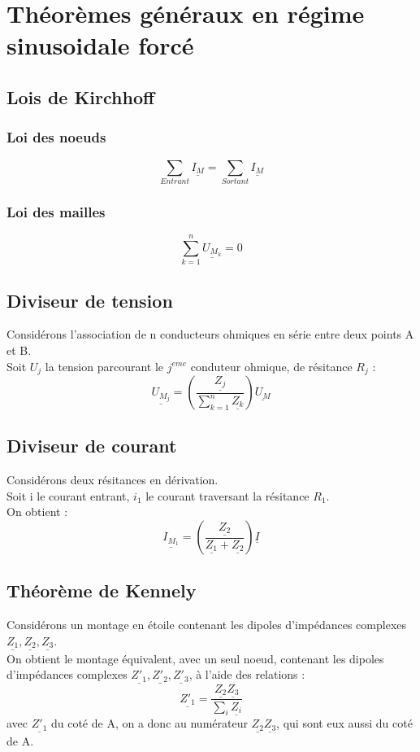 \section{Théorèmes généraux en régime sinusoidale forcé}
\subsection{Lois de Kirchhoff}
\subsubsection{Loi des noeuds}
$$\sum_{Entrant}\underline{I_M} = \sum_{Sortant}\underline{I_M}$$
\subsubsection{Loi des mailles}
$$\sum_{k=1}^n\underline{U_{M_k}} = 0$$
\subsection{Diviseur de tension}
Considérons l'association de n conducteurs ohmiques en série entre deux points A et B.\\
Soit $U_j$ la tension parcourant le $j^{eme}$ conduteur ohmique, de résitance $R_j$ :
$$\underline{U_{M_j}} = \left( \dfrac{\underline{Z_j}}{\sum_{k=1}^n \underline{Z_k}}\right)\underline{U_{M}} $$
\subsection{Diviseur de courant}
Considérons deux résitances en dérivation.\\
Soit i le courant entrant, $i_1$ le courant traversant la résitance $R_1$.\\
On obtient :
$$\underline{I_{M_1}} = \left( \dfrac{\underline{Z_2}}{\underline{Z_1}+\underline{Z_2}}\right)\underline{I}$$
\subsection{Théorème de Kennely}
Considérons un montage en étoile contenant les dipoles d'impédances complexes $\underline{Z_1},\underline{Z_2},\underline{Z_3}$.\\
On obtient le montage équivalent, avec un seul noeud, contenant les dipoles d'impédances complexes $\underline{Z'_1},\underline{Z'_2},\underline{Z'_3}$, à l'aide des relations :
$$\underline{Z'_1} = \dfrac{\underline{Z_2}\underline{Z_3}}{\sum_i \underline{Z_i}}$$
avec $\underline{Z'_1}$ du coté de A, on a donc au numérateur $\underline{Z_2}\underline{Z_3}$, qui sont eux aussi du coté de A.
